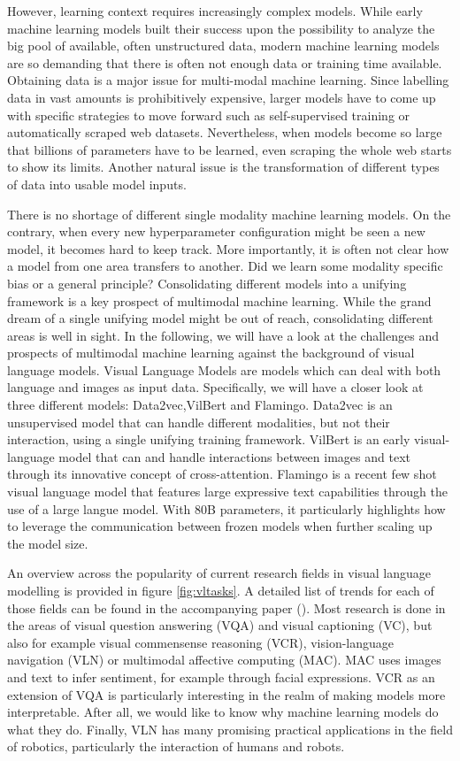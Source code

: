 \documentclass[
]{krantz}
\begin{document}
However, learning context requires increasingly complex models.
While early machine learning models built their success upon the possibility to analyze the big pool of available, often unstructured data, modern machine learning models are so demanding that there is often not enough data or training time available.
Obtaining data is a major issue for multi-modal machine learning. Since labelling data in vast amounts is prohibitively expensive, larger models have to come up with specific strategies to move forward such as self-supervised training or automatically scraped web datasets. Nevertheless, when models become so large that billions of parameters have to be learned, even scraping the whole web starts to show its limits. Another natural issue is the transformation of different types of data into usable model inputs.

There is no shortage of different single modality machine learning models.
On the contrary, when every new hyperparameter configuration might be seen a new model, it becomes hard to keep track. More importantly, it is often not clear how a model from one area transfers to another. Did we learn some modality specific bias or a general principle? Consolidating different models into a unifying framework is a key prospect of multimodal machine learning. While the grand dream of a single unifying model might be out of reach, consolidating different areas
is well in sight.
In the following, we will have a look at the challenges and prospects of multimodal machine learning against the background of visual language models. Visual Language Models are models which can deal with both language and images as input data. Specifically, we will have a closer look at three different models: Data2vec,VilBert and Flamingo. Data2vec is an unsupervised
model that can handle different modalities, but not their interaction, using a single unifying training framework. VilBert is an early visual-language model that can and handle interactions between images and text through its innovative concept of cross-attention. Flamingo is a recent few shot visual language model that features large expressive text capabilities through the use of a large langue model. With 80B parameters, it particularly highlights how to leverage the communication between frozen models when further scaling up the model size.

An overview across the popularity of current research fields in visual language modelling is provided in figure \ref{fig:vltasks}. A detailed list of trends for each of those fields can be found in the accompanying paper (\citet{uppal2022multimodal}). Most research is done in the
areas of visual question answering (VQA) and visual captioning (VC), but also for example visual commensense reasoning (VCR), vision-language navigation (VLN) or multimodal affective computing (MAC). MAC uses images and text to infer sentiment, for example through facial expressions. VCR as an extension of VQA is particularly interesting in the realm of making models more interpretable.
After all, we would like to know why machine learning models do what they do. Finally, VLN has many promising practical applications in the field of robotics, particularly the interaction of humans and robots.
\end{document}
